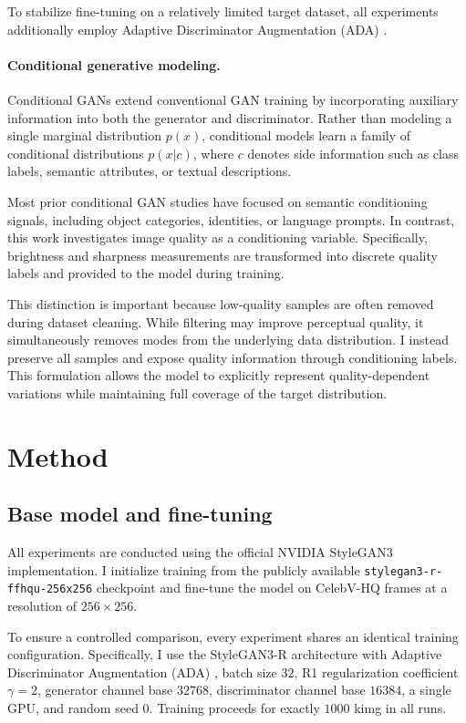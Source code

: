\documentclass{article}
\begin{document}
To stabilize fine-tuning on a relatively limited target dataset, all experiments additionally employ Adaptive Discriminator Augmentation (ADA) \citep{karras2020ada}.

\paragraph{Conditional generative modeling.}
Conditional GANs extend conventional GAN training by incorporating auxiliary information into both the generator and discriminator. Rather than modeling a single marginal distribution $p(x)$, conditional models learn a family of conditional distributions $p(x|c)$, where $c$ denotes side information such as class labels, semantic attributes, or textual descriptions.

Most prior conditional GAN studies have focused on semantic conditioning signals, including object categories, identities, or language prompts. In contrast, this work investigates image quality as a conditioning variable. Specifically, brightness and sharpness measurements are transformed into discrete quality labels and provided to the model during training.

This distinction is important because low-quality samples are often removed during dataset cleaning. While filtering may improve perceptual quality, it simultaneously removes modes from the underlying data distribution. I instead preserve all samples and expose quality information through conditioning labels. This formulation allows the model to explicitly represent quality-dependent variations while maintaining full coverage of the target distribution.

\section{Method}

\subsection{Base model and fine-tuning}
All experiments are conducted using the official NVIDIA StyleGAN3 implementation. I initialize training from the publicly available \texttt{stylegan3-r-ffhqu-256x256} checkpoint and fine-tune the model on CelebV-HQ frames at a resolution of $256\times256$.

To ensure a controlled comparison, every experiment shares an identical training configuration. Specifically, I use the StyleGAN3-R architecture with Adaptive Discriminator Augmentation (ADA) \citep{karras2020ada}, batch size $32$, R1 regularization coefficient $\gamma=2$, generator channel base $32768$, discriminator channel base $16384$, a single GPU, and random seed $0$. Training proceeds for exactly $1000$ kimg in all runs.
\end{document}
